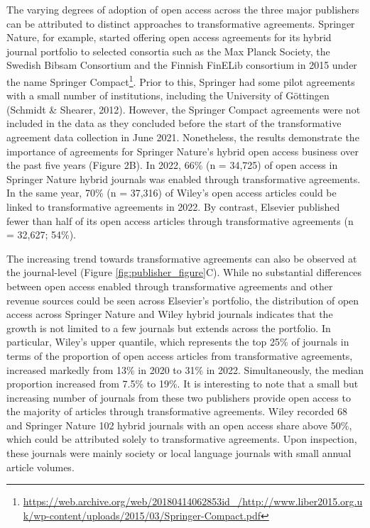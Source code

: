 \documentclass[a4paper,man,floatsintext,longtable,noextraspace,12pt]{apa6}
\begin{document}
The varying degrees of adoption of open access across the three major
publishers can be attributed to distinct approaches to transformative
agreements. Springer Nature, for example, started offering open access
agreements for its hybrid journal portfolio to selected consortia such
as the Max Planck Society, the Swedish Bibsam Consortium and the Finnish
FinELib consortium in 2015 under the name Springer Compact\footnote{\url{https://web.archive.org/web/20180414062853id_/http://www.liber2015.org.uk/wp-content/uploads/2015/03/Springer-Compact.pdf}}.
Prior to this, Springer had some pilot agreements with a small number of
institutions, including the University of Göttingen (Schmidt \& Shearer,
2012). However, the Springer Compact agreements were not included in the
data as they concluded before the start of the transformative agreement
data collection in June 2021. Nonetheless, the results demonstrate the
importance of agreements for Springer Nature's hybrid open access
business over the past five years (Figure 2B). In 2022, 66\% (n =
34,725) of open access in Springer Nature hybrid journals was enabled
through transformative agreements. In the same year, 70\% (n = 37,316)
of Wiley's open access articles could be linked to transformative
agreements in 2022. By contrast, Elsevier published fewer than half of
its open access articles through transformative agreements (n = 32,627;
54\%).

The increasing trend towards transformative agreements can also be
observed at the journal-level (Figure \ref{fig:publisher_figure}C).
While no substantial differences between open access enabled through
transformative agreements and other revenue sources could be seen across
Elsevier's portfolio, the distribution of open access across Springer
Nature and Wiley hybrid journals indicates that the growth is not
limited to a few journals but extends across the portfolio. In
particular, Wiley's upper quantile, which represents the top 25\% of
journals in terms of the proportion of open access articles from
transformative agreements, increased markedly from 13\% in 2020 to 31\%
in 2022. Simultaneously, the median proportion increased from 7.5\% to
19\%. It is interesting to note that a small but increasing number of
journals from these two publishers provide open access to the majority
of articles through transformative agreements. Wiley recorded 68 and
Springer Nature 102 hybrid journals with an open access share above
50\%, which could be attributed solely to transformative agreements.
Upon inspection, these journals were mainly society or local language
journals with small annual article volumes.
\end{document}
